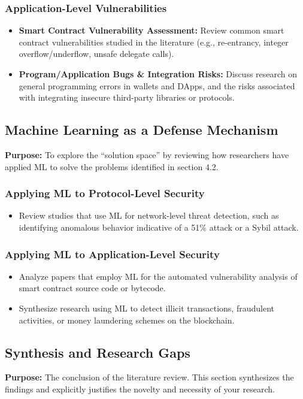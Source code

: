 	\subsubsection{Application-Level Vulnerabilities}
	\begin{itemize}
		\item \textbf{Smart Contract Vulnerability Assessment:} Review common smart contract vulnerabilities studied in the literature (e.g., re-entrancy, integer overflow/underflow, unsafe delegate calls).
		\item \textbf{Program/Application Bugs \& Integration Risks:} Discuss research on general programming errors in wallets and DApps, and the risks associated with integrating insecure third-party libraries or protocols.
	\end{itemize}
	
	\subsection{Machine Learning as a Defense Mechanism}
	\textbf{Purpose:} To explore the ``solution space'' by reviewing how researchers have applied ML to solve the problems identified in section 4.2.
	
	\subsubsection{Applying ML to Protocol-Level Security}
	\begin{itemize}
		\item Review studies that use ML for network-level threat detection, such as identifying anomalous behavior indicative of a 51\% attack or a Sybil attack.
	\end{itemize}
	
	\subsubsection{Applying ML to Application-Level Security}
	\begin{itemize}
		\item Analyze papers that employ ML for the automated vulnerability analysis of smart contract source code or bytecode.
		\item Synthesize research using ML to detect illicit transactions, fraudulent activities, or money laundering schemes on the blockchain.
	\end{itemize}
	
	\subsection{Synthesis and Research Gaps}
	\textbf{Purpose:} The conclusion of the literature review. This section synthesizes the findings and explicitly justifies the novelty and necessity of your research.
	
